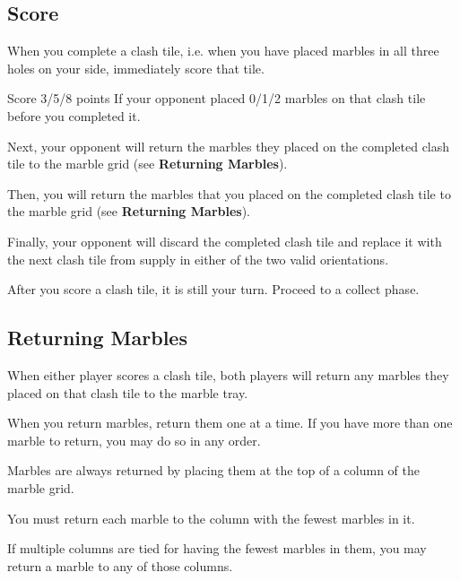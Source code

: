 \newpage

\subsection*{Score}
When you complete a clash tile, i.e. when you have placed marbles in all three holes on your side, immediately score that tile.

Score 3/5/8 points If your opponent placed 0/1/2 marbles on that clash tile before you completed it.

Next, your opponent will return the marbles they placed on the completed clash tile to the marble grid (see \textbf{Returning Marbles}).

Then, you will return the marbles that you placed on the completed clash tile to the marble grid (see \textbf{Returning Marbles}).

Finally, your opponent will discard the completed clash tile and replace it with the next clash tile from supply in either of the two valid orientations.
 
After you score a clash tile, it is still your turn. Proceed to a collect phase. 

\newpage

\subsection*{Returning Marbles}
When either player scores a clash tile, both players will return any marbles they placed on that clash tile to the marble tray.

When you return marbles, return them one at a time.
If you have more than one marble to return, you may do so in any order.

Marbles are always returned by placing them at the top of a column of the marble grid.

You must return each marble to the column with the fewest marbles in it.

If multiple columns are tied for having the fewest marbles in them, you may return a marble to any of those columns.

